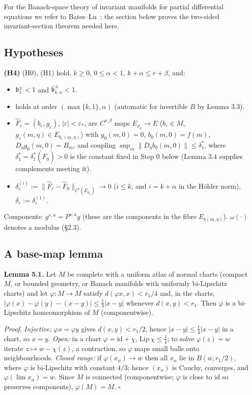 \documentclass[11pt,a4paper]{article}
\theoremstyle{plain}
\theoremstyle{definition}
\theoremstyle{remark}
\numberwithin{equation}{section}
\numberwithin{figure}{section}
\begin{document}
For the Banach-space theory of invariant manifolds for partial differential equations we refer to Bates–Lu~\cite{bates1995}; the section below proves the two-sided invariant-section theorem needed here.

\subsection{Hypotheses}

\textbf{(H4)} (H0), (H1) hold, $k\ge0$, $0\le\alpha<1$, $k+\alpha\le r+\beta$, and:

\begin{itemize}
    \item[(B)] $\mathfrak b^\pm_1<1$ and $\bar{\mathfrak b}^\pm_{k,\alpha}<1$.
    \item[(H3)] holds at order $(\max\{k,1\},\alpha)$ (automatic for invertible $B$ by Lemma 3.3).
    \item $\widehat F_\varepsilon=(b_\varepsilon,g_\varepsilon)$, $|\varepsilon|<\varepsilon_*$, are $C^{r,\beta}$ maps $E_{\rho_0}\to E$ ($b_\varepsilon\in M$, $g_\varepsilon(m,\eta)\in E_{b_\varepsilon(m,\eta)}$) with $g_0(m,0)=0$, $b_0(m,0)=f(m)$, $D_\eta g_0(m,0)=B_m$, and coupling $\sup_m\|D_\eta b_0(m,0)\|\le\delta_1^*$, where $\delta_1^*=\delta^*_1(\widehat F_0)>0$ is the constant fixed in Step 0 below (Lemma 3.4 supplies complements meeting it).
    \item $\delta^{(i)}_\varepsilon:=\|\widehat F_\varepsilon-\widehat F_0\|_{C^i(E_{\rho_0})}\to0$ ($i\le k$, and $i=k+\alpha$ in the Hölder norm), $\delta_\varepsilon:=\delta^{(1)}_\varepsilon$.
\end{itemize}

Components: $g^{s,u}=P^{s,u}g$ (these are the components in the fibre $E_{b(m,\eta)}$). $\omega(\cdot)$ denotes a modulus (§2.3).

\subsection{A base-map lemma}

\textbf{Lemma 5.1.} Let $M$ be complete with a uniform atlas of normal charts (compact $M$, or bounded geometry, or Banach manifolds with uniformly bi-Lipschitz charts) and let $\varphi:M\to M$ satisfy $d(\varphi x,x)<r_1/4$ and, in the charts, $|\varphi(x)-\varphi(y)-(x-y)|\le\tfrac14|x-y|$ whenever $d(x,y)<r_1$. Then $\varphi$ is a bi-Lipschitz homeomorphism of $M$ (componentwise).

\textit{Proof.} \textit{Injective:} $\varphi x=\varphi y$ gives $d(x,y)<r_1/2$, hence $|x-y|\le\frac14|x-y|$ in a chart, so $x=y$. \textit{Open:} in a chart $\varphi=\mathrm{id}+\chi$, $\mathrm{Lip}\,\chi\le\tfrac14$; to solve $\varphi(z)=w$ iterate $z\mapsto w-\chi(z)$, a contraction, so $\varphi$ maps small balls onto neighbourhoods. \textit{Closed range:} if $\varphi(x_n)\to w$ then all $x_n$ lie in $B(w,r_1/2)$, where $\varphi$ is bi-Lipschitz with constant $4/3$; hence $(x_n)$ is Cauchy, converges, and $\varphi(\lim x_n)=w$. Since $M$ is connected (componentwise; $\varphi$ is close to $\mathrm{id}$ so preserves components), $\varphi(M)=M$. $\square$
\end{document}
